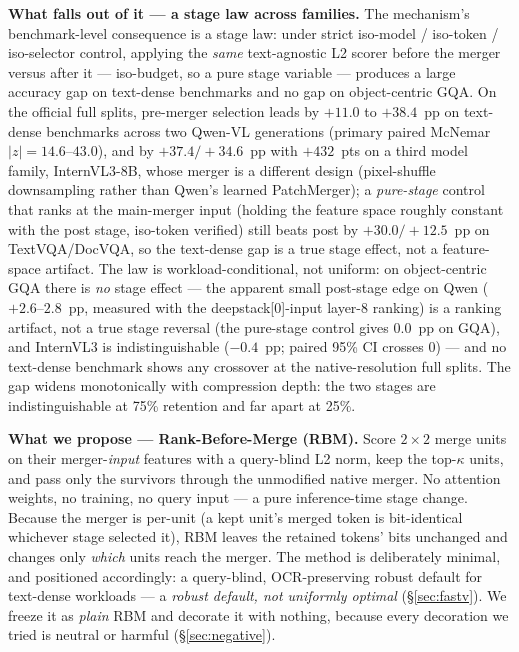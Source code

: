 \documentclass[sigconf,review,anonymous]{acmart}
\begin{document}
\textbf{What falls out of it --- a stage law across families.} The mechanism's
benchmark-level consequence is a stage law: under strict iso-model / iso-token /
iso-selector control, applying the \emph{same} text-agnostic L2 scorer before
the merger versus after it --- iso-budget, so a pure stage variable ---
produces a large accuracy gap on text-dense benchmarks and no gap on
object-centric GQA. On the official full splits, pre-merger
selection leads by $+11.0$ to $+38.4$~pp on text-dense benchmarks across two
Qwen-VL generations (primary paired McNemar $|z| = 14.6$--$43.0$), and by
$+37.4 / +34.6$~pp with $+432$~pts on a third model family, InternVL3-8B,
whose merger is a different design (pixel-shuffle downsampling rather than
Qwen's learned PatchMerger); a \emph{pure-stage} control that ranks at the
main-merger input (holding the feature space roughly constant with the post
stage, iso-token verified) still beats post by $+30.0 / +12.5$~pp on
TextVQA/DocVQA, so the text-dense gap is a true stage effect, not a
feature-space artifact. The law is workload-conditional, not uniform: on
object-centric GQA there is \emph{no} stage effect --- the apparent small
post-stage edge on Qwen ($+2.6$--$2.8$~pp, measured with the
deepstack[0]-input layer-8 ranking) is a ranking artifact, not a true stage
reversal (the pure-stage control gives $0.0$~pp on GQA), and InternVL3 is
indistinguishable ($-0.4$~pp; paired 95\% CI crosses 0) --- and no
text-dense benchmark shows any crossover at the native-resolution full splits.
The gap widens monotonically with compression depth: the two stages are
indistinguishable at 75\% retention and far apart at 25\%.

\textbf{What we propose --- Rank-Before-Merge (RBM).} Score $2\!\times\!2$ merge
units on their merger-\emph{input} features with a query-blind L2 norm, keep the
top-$\kappa$ units, and pass only the survivors through the unmodified native
merger. No attention weights, no training, no query input --- a pure
inference-time stage change. Because the merger is per-unit (a kept unit's
merged token is bit-identical whichever stage selected it), RBM leaves the
retained tokens' bits unchanged and changes only \emph{which} units reach the
merger. The method is deliberately minimal, and positioned accordingly: a
query-blind, OCR-preserving robust default for text-dense workloads --- a
\emph{robust default, not uniformly optimal} (\S\ref{sec:fastv}). We freeze it
as \emph{plain} RBM and decorate it with nothing, because every decoration we
tried is neutral or harmful (\S\ref{sec:negative}).
\end{document}
